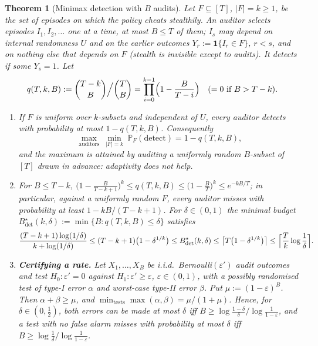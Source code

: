 \documentclass[11pt,a4paper]{article}
\newtheorem{theorem}{Theorem}
\newcommand{\Prob}{\mathbb{P}}
\begin{document}
\begin{theorem}[Minimax detection with $B$ audits]\label{thm:audit-detection}
Let $F\subseteq[T]$, $|F|=k\ge1$, be the set of episodes on which the policy
cheats stealthily. An \emph{auditor} selects episodes $I_1,I_2,\dots$ one at a
time, at most $B\le T$ of them; $I_s$ may depend on internal randomness $U$ and
on the earlier outcomes $Y_r:=\mathbf 1\{I_r\in F\}$, $r<s$, and on nothing else
that depends on $F$ (stealth is invisible except to audits). It \emph{detects}
if some $Y_s=1$. Let
\[
  q(T,k,B):=\binom{T-k}{B}\Big/\binom{T}{B}=\prod_{i=0}^{k-1}\Bigl(1-\frac{B}{T-i}\Bigr)
  \quad(\text{$=0$ if $B>T-k$}).
\]
\begin{enumerate}
\item[\textup{(a)}] If $F$ is uniform over $k$-subsets and independent of $U$,
every auditor detects with probability at most $1-q(T,k,B)$. Consequently
\[
  \max_{\text{auditors}}\ \min_{|F|=k}\ \Prob_F(\text{detect})=1-q(T,k,B),
\]
and the maximum is attained by auditing a uniformly random $B$-subset of
$[T]$ drawn in advance: adaptivity does not help.
\item[\textup{(b)}] For $B\le T-k$,
$\bigl(1-\tfrac{B}{T-k+1}\bigr)^k\le q(T,k,B)\le\bigl(1-\tfrac BT\bigr)^k\le e^{-kB/T}$;
in particular, against a uniformly random $F$, every auditor misses with
probability at least $1-kB/(T-k+1)$. For $\delta\in(0,1)$ the minimal budget
$B^\star_{\mathrm{det}}(k,\delta):=\min\{B:q(T,k,B)\le\delta\}$ satisfies
\[
 \frac{(T-k+1)\log(1/\delta)}{k+\log(1/\delta)}\le
 (T-k+1)\bigl(1-\delta^{1/k}\bigr)\le B^\star_{\mathrm{det}}(k,\delta)\le
 \bigl\lceil T\bigl(1-\delta^{1/k}\bigr)\bigr\rceil\le
 \Bigl\lceil\frac Tk\log\frac1\delta\Bigr\rceil .
\]
\item[\textup{(c)}] \textbf{Certifying a rate.} Let $X_1,\dots,X_B$ be i.i.d.\
Bernoulli$(\varepsilon')$ audit outcomes and test
$H_0:\varepsilon'=0$ against $H_1:\varepsilon'\ge\varepsilon$, $\varepsilon\in(0,1)$,
with a possibly randomised test of type-I error $\alpha$ and worst-case type-II
error $\beta$. Put $\mu:=(1-\varepsilon)^B$. Then $\alpha+\beta\ge\mu$, and
$\min_{\text{tests}}\max(\alpha,\beta)=\mu/(1+\mu)$. Hence, for
$\delta\in(0,\tfrac12)$, both errors can be made at most $\delta$ iff
$B\ge\log\frac{1-\delta}{\delta}\big/\log\frac1{1-\varepsilon}$, and a test with
no false alarm misses with probability at most $\delta$ iff
$B\ge\log\frac1\delta\big/\log\frac1{1-\varepsilon}$.
\end{enumerate}
\end{theorem}
\end{document}
